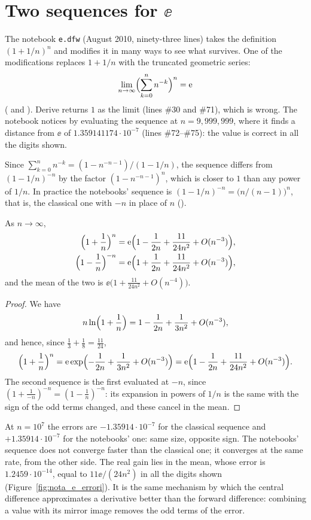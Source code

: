 \section{Two sequences for \texorpdfstring{$\ee$}{e}}
\label{sec:e}

The notebook \texttt{e.dfw} (August 2010, ninety-three lines) takes the
definition $(1+1/n)^n$ and modifies it in many ways to see what survives. One
of the modifications replaces $1+1/n$ with the truncated geometric series:
\[
  \lim_{n\to\infty}\Bigl(\sum_{k=0}^{n}n^{-k}\Bigr)^{n}=\mathrm{e}
\]
( and ). Derive returns $1$ as the
limit (lines \#30 and \#71), which is wrong. The notebook notices by
evaluating the sequence at $n=9{,}999{,}999$, where it finds a distance from
$\ee$ of $1.359141174\cdot10^{-7}$ (lines \#72--\#75): the value is correct
in all the digits shown.

Since $\sum_{k=0}^{n}n^{-k}=(1-n^{-n-1})/(1-1/n)$, the sequence differs from
$(1-1/n)^{-n}$ by the factor $(1-n^{-n-1})^n$, which is closer to $1$ than
any power of $1/n$. In practice the notebooks' sequence is
$(1-1/n)^{-n}=\bigl(n/(n-1)\bigr)^n$, that is, the classical one with $-n$ in
place of $n$ ().

\begin{prop}\label{prop:e}
As $n\to\infty$,
\begin{align*}
  \Bigl(1+\frac1n\Bigr)^{n}&=\mathrm{e}\Bigl(1-\frac{1}{2n}+\frac{11}{24n^2}+O(n^{-3})\Bigr),\\
  \Bigl(1-\frac1n\Bigr)^{-n}&=\mathrm{e}\Bigl(1+\frac{1}{2n}+\frac{11}{24n^2}+O(n^{-3})\Bigr),
\end{align*}
and the mean of the two is $\ee\bigl(1+\frac{11}{24n^2}+O(n^{-4})\bigr)$.
\end{prop}

\begin{proof}
We have
\[
  n\ln\Bigl(1+\frac1n\Bigr)=1-\frac{1}{2n}+\frac{1}{3n^2}+O(n^{-3}),
\]
and hence, since $\frac13+\frac18=\frac{11}{24}$,
\[
  \Bigl(1+\frac1n\Bigr)^{n}=\mathrm{e}\exp\Bigl(-\frac1{2n}+\frac1{3n^2}+O(n^{-3})\Bigr)
  =\mathrm{e}\Bigl(1-\frac1{2n}+\frac{11}{24n^2}+O(n^{-3})\Bigr).
\]
The second sequence is the first evaluated at $-n$, since
$(1+\frac{1}{-n})^{-n}=(1-\frac1n)^{-n}$: its expansion in powers of $1/n$ is
the same with the sign of the odd terms changed, and these cancel in the
mean.
\end{proof}

At $n=10^7$ the errors are $-1.35914\cdot10^{-7}$ for the classical sequence
and $+1.35914\cdot10^{-7}$ for the notebooks' one: same size, opposite sign.
The notebooks' sequence does not converge faster than the classical one; it
converges at the same rate, from the other side. The real gain lies in the
mean, whose error is $1.2459\cdot10^{-14}$, equal to $11\ee/(24n^2)$ in all
the digits shown (Figure~\ref{fig:nota_e_errori}). It is the same mechanism
by which the central difference approximates a derivative better than the
forward difference: combining a value with its mirror image removes the odd
terms of the error.


